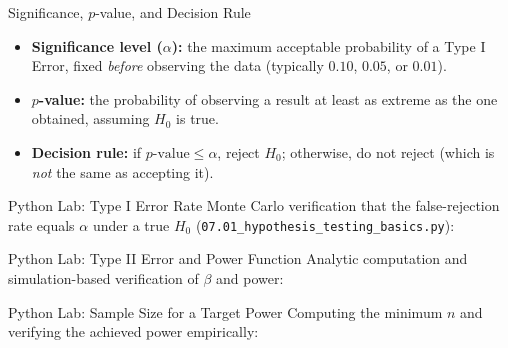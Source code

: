 \documentclass[10pt, aspectratio=169]{beamer}
\begin{document}
\begin{frame}{Significance, $p$-value, and Decision Rule}
  \footnotesize
  \begin{itemize}\itemsep=0.12cm
    \item \textbf{Significance level ($\alpha$):} the maximum acceptable probability of a Type I Error, fixed \emph{before} observing the data (typically $0.10$, $0.05$, or $0.01$). \pause
    \item \textbf{$p$-value:} the probability of observing a result at least as extreme as the one obtained, assuming $H_0$ is true. \pause
    \item \textbf{Decision rule:} if $p\text{-value} \le \alpha$, reject $H_0$; otherwise, do not reject (which is \emph{not} the same as accepting it).
  \end{itemize}
\end{frame}

\begin{frame}[fragile]{Python Lab: Type I Error Rate}
  \scriptsize
  Monte Carlo verification that the false-rejection rate equals $\alpha$ under a true $H_0$ (\texttt{07.01\_hypothesis\_testing\_basics.py}):
  {
  }
\end{frame}

\begin{frame}[fragile]{Python Lab: Type II Error and Power Function}
  \scriptsize
  Analytic computation and simulation-based verification of $\beta$ and power:
  {
  }
\end{frame}

\begin{frame}[fragile]{Python Lab: Sample Size for a Target Power}
  \scriptsize
  Computing the minimum $n$ and verifying the achieved power empirically:
  {
  }
\end{frame}
\end{document}

